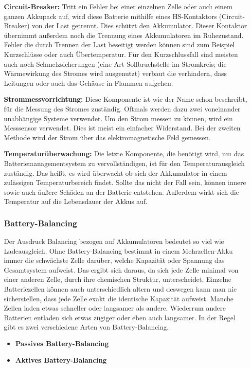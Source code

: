 \textbf{Circuit-Breaker:}
Tritt ein Fehler bei einer einzelnen Zelle oder auch einem ganzen Akkupack auf, wird diese Batterie mithilfe eines HS-Kontaktors (Circuit-Breaker) von der Last getrennt. Dies schützt den Akkumulator. Dieser Kontaktor übernimmt außerdem noch die Trennung eines Akkumulatoren im Ruhezustand. Fehler die durch Trennen der Last beseitigt werden können sind zum Beispiel Kurzschlüsse oder auch Übertemperatur. Für den Kurzschlussfall sind meisten auch noch Schmelzsicherungen (eine Art Sollbruchstelle im Stromkreis; die Wärmewirkung des Stromes wird ausgenutzt) verbaut die verhindern, dass Leitungen oder auch das Gehäuse in Flammen aufgehen.

\textbf{Strommessvorrichtung:}
Diese Komponente ist wie der Name schon beschreibt, für die Messung des Stromes zuständig. Oftmals werden dazu zwei voneinander unabhängige Systeme verwendet. Um den Strom messen zu können, wird ein Messsensor verwendet. Dies ist meist ein einfacher Widerstand. Bei der zweiten Methode wird der Strom über das elektromagnetische Feld gemessen.

\textbf{Temperaturüberwachung:}
Die letzte Komponente, die benötigt wird, um das Batteriemanagementsystem zu vervollständigen, ist für den Temperaturausgleich zuständig. Das heißt, es wird überwacht ob sich der Akkumulator in einem zulässigen Temperaturbereich findet. Sollte das nicht der Fall sein, können innere sowie auch äußere Schäden an der Batterie entstehen. Außerdem wirkt sich die Temperatur auf die Lebensdauer der Akkus auf.
\newpage

\subsubsection{Battery-Balancing}
\label{Battery-Balancing}
Der Ausdruck Balancing bezogen auf Akkumulatoren bedeutet so viel wie Ladeausgleich. Ohne Battery-Balancing bestimmt in einem Mehrzellen-Akku immer die schwächste Zelle darüber, welche Kapazität oder Spannung das Gesamtsystem aufweist. Das ergibt sich daraus, da sich jede Zelle minimal von einer anderen Zelle, durch ihre chemischen Struktur, unterscheidet. Einzelne Batteriezellen können auch unterschiedlich altern und deswegen kann man nie sicherstellen, dass jede Zelle exakt die identische Kapazität aufweist. Manche Zellen laden etwas schneller oder langsamer als andere. Wiederrum andere Batterien entladen sich etwas zügiger oder eben auch langsamer. In der Regel gibt es zwei verschiedene Arten von Battery-Balancing.
\begin{itemize}
\item \textbf{Passives Battery-Balancing} \medskip\\
\item \textbf{Aktives Battery-Balancing} \medskip\\
\end{itemize}


